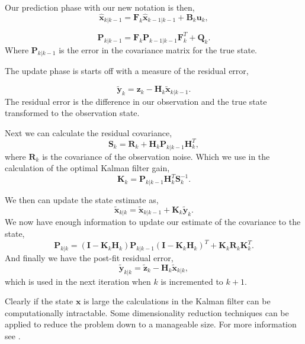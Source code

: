 Our prediction phase with our new notation is then,
\begin{equation}
\hat{\mathbf{x}}_{k|k-1} = \mathbf{F}_k\hat{\mathbf{x}}_{k-1|k-1} + \mathbf{B}_k\mathbf{u}_k,
\end{equation}

\begin{equation}
\mathbf{P}_{k|k-1} = \mathbf{F}_k\mathbf{P}_{k-1|k-1}\mathbf{F}_k^T + \mathbf{Q}_k.
\end{equation}
\noindent
Where $\mathbf{P}_{k|k-1}$ is the error in the covariance matrix for the true state. 

The update phase is starts off with a measure of the residual error,

\begin{equation}
\tilde{\mathbf{y}}_k = \mathbf{z}_k - \mathbf{H}_{k}\tilde{\mathbf{x}}_{k|k-1}.
\end{equation}
\noindent
The residual error is the difference in our observation and the true state transformed to the observation state. 

Next we can calculate the residual covariance,
\begin{equation}
\mathbf{S}_k = \mathbf{R}_k + \mathbf{H}_{k}\mathbf{P}_{k|k-1}\mathbf{H}_{k}^T,
\end{equation}
\noindent
where $\mathbf{R}_k$ is the covariance of the observation noise. Which we use in the calculation of the optimal Kalman filter gain,
\begin{equation}
\mathbf{K}_k = \mathbf{P}_{k|k-1}\mathbf{H}_{k}^T\mathbf{S}_k^{-1}.
\end{equation}
\noindent

We then can update the state estimate as,
\begin{equation}
\tilde{\mathbf{x}}_{k|k} = \tilde{\mathbf{x}}_{k|k-1} +  \mathbf{K}_k\tilde{\mathbf{y}}_{k}.
\end{equation}
\noindent
We now have enough information to update our estimate of the covariance to the state,
\begin{equation}
\mathbf{P}_{k|k} = \left(\mathbf{I} - \mathbf{K}_k\mathbf{H}_{k}\right) \mathbf{P}_{k|k-1}\left(\mathbf{I} - \mathbf{K}_k\mathbf{H}_{k}\right)^T + \mathbf{K}_k\mathbf{R}_k\mathbf{K}_k^T.
\end{equation}
\noindent
And finally we have the post-fit residual error,
\begin{equation}
\tilde{\mathbf{y}}_{k|k} = \tilde{\mathbf{z}}_{k} -  \mathbf{H}_k\tilde{\mathbf{x}}_{k|k},
\end{equation}
\noindent
which is used in the next iteration when $k$ is incremented to $k+1$. 

Clearly if the state $\mathbf{x}$ is large the calculations in the Kalman filter can be computationally intractable. Some dimensionality reduction techniques can be applied to reduce the problem down to a manageable size. For more information see \cite{Kay98}.
